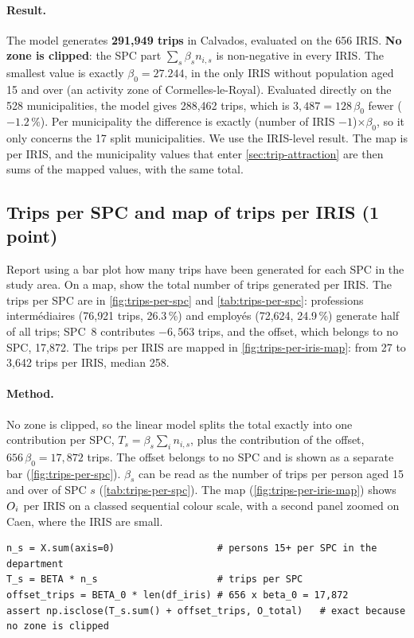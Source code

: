 \paragraph{Result.}
The model generates \textbf{291{,}949 trips} in Calvados, evaluated on the 656 IRIS. \textbf{No zone is clipped}: the
SPC part $\sum_s \beta_s n_{i,s}$ is non-negative in every IRIS. The smallest value is exactly $\beta_0 = 27.244$,
in the only IRIS without population aged 15 and over (an activity zone of Cormelles-le-Royal). Evaluated directly on the
528 municipalities, the model gives 288{,}462 trips, which is $3{,}487 = 128\,\beta_0$ fewer ($-1.2\,\%$). Per
municipality the difference is exactly (number of IRIS $- 1$)$\times \beta_0$, so it only concerns the 17 split
municipalities. We use the IRIS-level result. The map is per IRIS, and the municipality values that enter
\cref{sec:trip-attraction} are then sums of the mapped values, with the same total.

\subsection{Trips per SPC and map of trips per IRIS (1 point)}

\begin{qa}{Report using a bar plot how many trips have been generated for each SPC in the study area. On a map, show the
total number of trips generated per IRIS.}
The trips per SPC are in \cref{fig:trips-per-spc} and \cref{tab:trips-per-spc}: professions interm\'ediaires
(76{,}921 trips, 26.3\,\%) and employ\'es (72{,}624, 24.9\,\%) generate half of all trips; SPC~8 contributes
$-6{,}563$ trips, and the offset, which belongs to no SPC, 17{,}872. The trips per IRIS are mapped in
\cref{fig:trips-per-iris-map}: from 27 to 3{,}642 trips per IRIS, median 258.
\end{qa}

\paragraph{Method.}
No zone is clipped, so the linear model splits the total exactly into one contribution per SPC,
$T_s = \beta_s \sum_i n_{i,s}$, plus the contribution of the offset, $656\,\beta_0 = 17{,}872$ trips. The offset
belongs to no SPC and is shown as a separate bar (\cref{fig:trips-per-spc}). $\beta_s$ can be read as the number of
trips per person aged 15 and over of SPC $s$ (\cref{tab:trips-per-spc}). The map (\cref{fig:trips-per-iris-map}) shows
$O_i$ per IRIS on a classed sequential colour scale, with a second panel zoomed on Caen, where the IRIS are small.
\begin{lstlisting}[style=py]
n_s = X.sum(axis=0)                  # persons 15+ per SPC in the department
T_s = BETA * n_s                     # trips per SPC
offset_trips = BETA_0 * len(df_iris) # 656 x beta_0 = 17,872
assert np.isclose(T_s.sum() + offset_trips, O_total)   # exact because no zone is clipped
\end{lstlisting}

